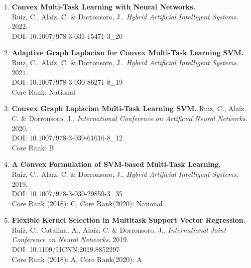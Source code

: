 \begin{enumerate}
    \item \textbf{Convex Multi-Task Learning with Neural Networks.}\\
    {Ruiz, C.}, Alaíz, C. \& Dorronsoro, J.. 
    \emph{Hybrid Artificial Intelligent Systems}. 2022.\\
    DOI: 10.1007/978-3-031-15471-3\_20\\
    \item \textbf{Adaptive Graph Laplacian for Convex Multi-Task Learning SVM.}\\
    {Ruiz, C.}, Alaíz, C. \& Dorronsoro, J.. 
    \emph{Hybrid Artificial Intelligent Systems}. 2021.\\
    DOI: 10.1007/978-3-030-86271-8\_19\\
    Core Rank: National
    \item \textbf{Convex Graph Laplacian Multi-Task Learning SVM.}
    {Ruiz, C.}, Alaíz, C. \& Dorronsoro, J.. 
    \emph{International Conference on Artificial Neural Networks}. 2020.\\
    DOI: 10.1007/978-3-030-61616-8\_12\\
    Core Rank: B
    \item \textbf{A Convex Formulation of SVM-based Multi-Task Learning.}\\
    {Ruiz, C.}, Alaíz, C. \& Dorronsoro, J.. 
    \emph{Hybrid Artificial Intelligent Systems}. 2019.\\
    DOI: 10.1007/978-3-030-29859-3\_35\\
    Core Rank (2018): C, Core Rank(2020): National
    \item \textbf{Flexible Kernel Selection in Multitask
    Support Vector Regression.}\\
    Ruiz, C., Catalina, A., Alaíz, C. \& Dorronsoro, J.. 
    \emph{International Joint Conference on Neural Networks}. 2019.\\
    DOI: 10.1109/IJCNN.2019.8852297\\
    Core Rank (2018): A, Core Rank(2020): A
\end{enumerate}
%
